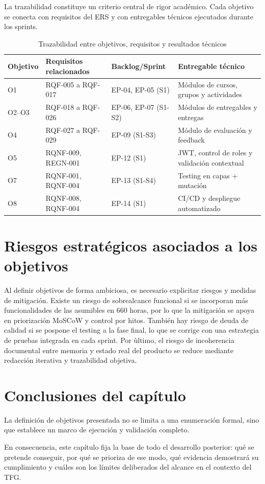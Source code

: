 La trazabilidad constituye un criterio central de rigor acad\'emico.
Cada objetivo se conecta con requisitos del ERS
y con entregables t\'ecnicos ejecutados durante los sprints.

\begin{table}[!htbp]
\centering
\begin{tabular}{|P{1.9cm}|P{3.2cm}|P{3.6cm}|P{3.7cm}|}
\hline
\textbf{Objetivo} & \textbf{Requisitos relacionados} & \textbf{Backlog/Sprint} & \textbf{Entregable t\'ecnico} \\
\hline
O1 & RQF-005 a RQF-017 & EP-04, EP-05 (S1) & M\'odulos de cursos, grupos y actividades \\
\hline
O2--O3 & RQF-018 a RQF-026 & EP-06, EP-07 (S1-S2) & M\'odulos de entregables y entregas \\
\hline
O4 & RQF-027 a RQF-029 & EP-09 (S1-S3) & M\'odulo de evaluaci\'on y feedback \\
\hline
O5 & RQNF-009, REGN-001 & EP-12 (S1) & JWT, control de roles y validaci\'on contextual \\
\hline
O7 & RQNF-001, RQNF-004 & EP-13 (S1-S4) & Testing en capas + mutaci\'on \\
\hline
O8 & RQNF-008, RQNF-004 & EP-14 (S1) & CI/CD y despliegue automatizado \\
\hline
\end{tabular}
\caption{Trazabilidad entre objetivos, requisitos y resultados t\'ecnicos}
\label{tab:trazabilidad-objetivos}
\end{table}

\FloatBarrier
\section{Riesgos estrat\'egicos asociados a los objetivos}

Al definir objetivos de forma ambiciosa, es necesario explicitar riesgos y medidas de mitigaci\'on. Existe un riesgo de sobrealcance funcional si se incorporan m\'as funcionalidades de las asumibles en 660 horas, por lo que la mitigaci\'on se apoya en priorizaci\'on MoSCoW y control por hitos. Tambi\'en hay riesgo de deuda de calidad si se pospone el testing a la fase final, lo que se corrige con una estrategia de pruebas integrada en cada sprint. Por \`ultimo, el riesgo de incoherencia documental entre memoria y estado real del producto se reduce mediante redacci\'on iterativa y trazabilidad objetiva.

\FloatBarrier
\section{Conclusiones del cap\'itulo}

La definici\'on de objetivos presentada no se limita a una enumeraci\'on formal,
sino que establece un marco de ejecuci\'on y validaci\'on completo.

En consecuencia, este cap\'itulo fija la base de todo el desarrollo posterior:
qu\'e se pretende conseguir, por qu\'e se prioriza de ese modo,
qu\'e evidencia demostrar\'a su cumplimiento
y cu\'ales son los l\'imites deliberados del alcance en el contexto del TFG.
	
